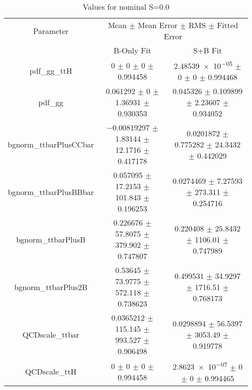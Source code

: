 \begin{table}
\centering
\caption{Values for nominal S=0.0}
\begin{tabular}{ccc}
\toprule
Parameter & \multicolumn{2}{c}{Mean $\pm$ Mean Error $\pm$ RMS $\pm$ Fitted Error}\\
 & B-Only Fit & S+B Fit\\
\midrule
pdf\_gg\_ttH & \num{0} $\pm$ \num{0} $\pm$ \num{0} $\pm$ \num{0.994458} & \num{2.48539e-05} $\pm$ \num{0} $\pm$ \num{0} $\pm$ \num{0.994468}\\
pdf\_gg & \num{0.061292} $\pm$ \num{0} $\pm$ \num{1.36931} $\pm$ \num{0.930353} & \num{0.045326} $\pm$ \num{0.109899} $\pm$ \num{2.23607} $\pm$ \num{0.934052}\\
bgnorm\_ttbarPlusCCbar & \num{-0.00819297} $\pm$ \num{1.83144} $\pm$ \num{12.1716} $\pm$ \num{0.417178} & \num{0.0201872} $\pm$ \num{0.775282} $\pm$ \num{24.3432} $\pm$ \num{0.442029}\\
bgnorm\_ttbarPlusBBbar & \num{0.057095} $\pm$ \num{17.2153} $\pm$ \num{101.843} $\pm$ \num{0.196253} & \num{0.0274469} $\pm$ \num{7.27593} $\pm$ \num{273.311} $\pm$ \num{0.254716}\\
bgnorm\_ttbarPlusB & \num{0.226676} $\pm$ \num{57.8075} $\pm$ \num{379.902} $\pm$ \num{0.747807} & \num{0.220408} $\pm$ \num{25.8432} $\pm$ \num{1106.01} $\pm$ \num{0.747989}\\
bgnorm\_ttbarPlus2B & \num{0.53645} $\pm$ \num{73.9775} $\pm$ \num{572.118} $\pm$ \num{0.738623} & \num{0.499531} $\pm$ \num{34.9297} $\pm$ \num{1716.51} $\pm$ \num{0.768173}\\
QCDscale\_ttbar & \num{0.0365212} $\pm$ \num{115.145} $\pm$ \num{993.527} $\pm$ \num{0.906498} & \num{0.0298894} $\pm$ \num{56.5397} $\pm$ \num{3053.49} $\pm$ \num{0.919778}\\
QCDscale\_ttH & \num{0} $\pm$ \num{0} $\pm$ \num{0} $\pm$ \num{0.994458} & \num{2.8623e-07} $\pm$ \num{0} $\pm$ \num{0} $\pm$ \num{0.994465}\\
\bottomrule
\end{tabular}
\end{table}